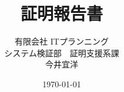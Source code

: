 \documentclass[12pt]{jreport}
\begin{document}
\title{証明報告書}
\author{有限会社 ITプランニング\\システム検証部　証明支援系課\\今井宜洋}
\date{\today}

\maketitle

\tableofcontents{}



\end{document}
